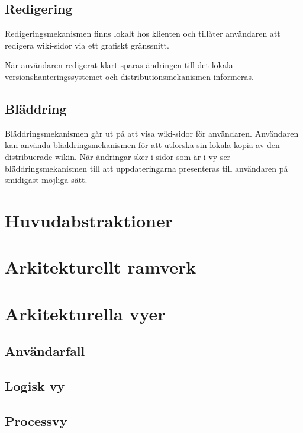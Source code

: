 \subsection{Redigering}
Redigeringsmekanismen finns lokalt hos klienten och tillåter användaren att redigera wiki-sidor via ett grafiskt gränssnitt.

När användaren redigerat klart sparas ändringen till det lokala versionshanteringssystemet och distributionsmekanismen informeras.
\subsection{Bläddring}
Bläddringsmekanismen går ut på att visa wiki-sidor för användaren. Användaren kan använda bläddringsmekanismen för att utforska sin lokala kopia av den distribuerade wikin. När ändringar sker i sidor som är i vy ser bläddringsmekanismen till att uppdateringarna presenteras till användaren på smidigast möjliga sätt.
\section{Huvudabstraktioner}
\section{Arkitekturellt ramverk}
\section{Arkitekturella vyer}
\subsection{Användarfall}
\subsection{Logisk vy}
\subsection{Processvy}

